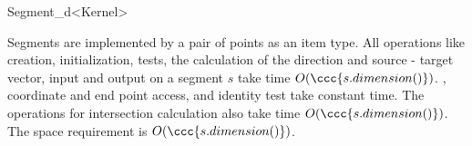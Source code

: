 \begin{ccRefClass}{Segment_d<Kernel>}
\ccImplementation

Segments are implemented by a pair of points as an item type.  All
operations like creation, initialization, tests, the calculation of
the direction and source - target vector, input and output on a
segment $s$ take time $O(\ccc{s.dimension()})$. ,
coordinate and end point access, and identity test take constant time.
The operations for intersection calculation also take time
$O(\ccc{s.dimension()})$. The space requirement is
$O(\ccc{s.dimension()})$.
 
\end{ccRefClass}



